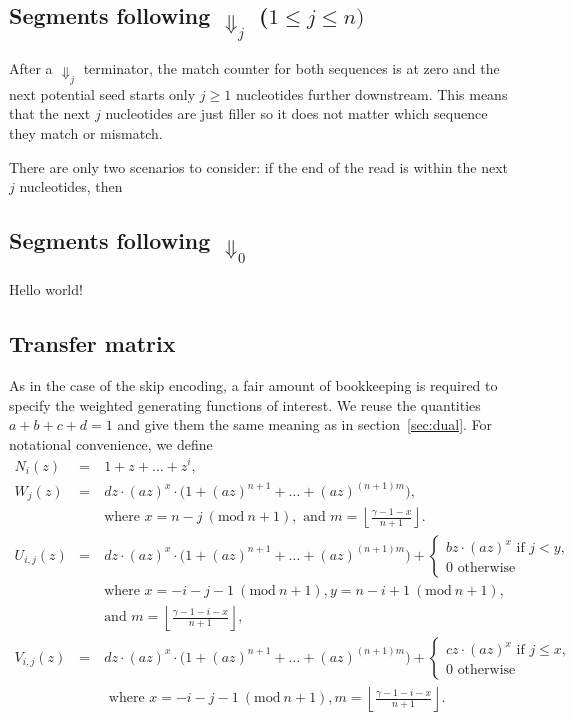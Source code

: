 \documentclass{article}
\newcommand{\modulo}[1]{\ (\mathrm{mod}\ #1)}
\begin{document}
\subsection{Segments following $\Downarrow_j$ ($1 \leq j \leq n)$}

After a $\Downarrow_j$ terminator, the match counter for both sequences is
at zero and the next potential seed starts only $j \geq 1$ nucleotides
further downstream. This means that the next $j$ nucleotides are just
filler so it does not matter which sequence they match or mismatch.

There are only two scenarios to consider: if the end of the read is within
the next $j$ nucleotides, then 



\subsection{Segments following $\Downarrow_0$}

Hello world!

\subsection{Transfer matrix}

As in the case of the skip encoding, a fair amount of bookkeeping is
required to specify the weighted generating functions of interest.
We reuse the quantities $a+b+c+d=1$ and give them the same meaning as in
section~\ref{sec:dual}. For notational convenience, we define
\begin{eqnarray}
\label{eq_N}
N_i(z) &=& 1+z+\ldots+z^i, \\
W_j(z) &=& dz \cdot (az)^x \cdot \big( 1 + (az)^{n+1} + \ldots +
  (az)^{(n+1)m} \big), \\
  &\quad& \text{where } x = n-j \modulo{n+1},
  \text{ and } m = \left\lfloor
  \frac{\gamma-1-x}{n+1} \right\rfloor. \\
U_{i,j}(z) &=& dz \cdot (az)^x \cdot
  \big( 1 + (az)^{n+1} + \ldots + (az)^{(n+1)m} \big) +
\begin{cases}
  bz\cdot(az)^x \text{ if } j < y, \\
  0 \text{ otherwise}
\end{cases} \\
  &\quad& \text{where } x = -i-j-1 \modulo{n+1},
  y = n-i+1 \modulo{n+1}, \\
  &\quad& \text{and } m = \left\lfloor \frac{\gamma-1-i-x}{n+1}
    \right\rfloor, \\
V_{i,j}(z) &=& dz \cdot (az)^x \cdot
  \big( 1 + (az)^{n+1} + \ldots + (az)^{(n+1)m} \big) +
\begin{cases}
  cz\cdot(az)^x \text{ if } j \leq x, \\
  0 \text{ otherwise}
\end{cases} \\
  &\quad& \text{ where } x = -i-j-1 \modulo{n+1},
  m = \left\lfloor \frac{\gamma-1-i-x}{n+1} \right\rfloor.
\end{eqnarray}
\end{document}
